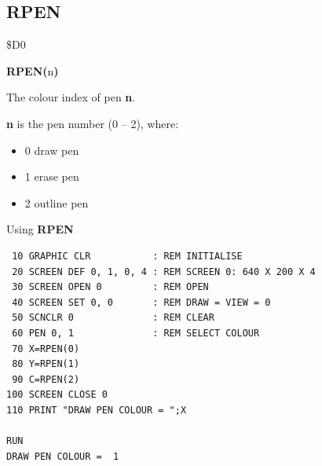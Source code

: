 \subsection{RPEN}
\begin{description}[leftmargin=2cm,style=nextline]
\item [Token:]    \$D0

\item [Format:]   {\bf RPEN(}n{\bf)}

\item [Returns:]  The colour index of pen {\bf n}.

                  {\bf n} is the pen number (0 -- 2), where:

                  \begin{itemize}
                     \item {0} draw pen
                     \item {1} erase pen
                     \item {2} outline pen
                  \end{itemize}

\item [Example:]  Using {\bf RPEN}

\begin{tcolorbox}[colback=black,coltext=white]
\verbatimfont{\codefont}
\begin{verbatim}
 10 GRAPHIC CLR           : REM INITIALISE
 20 SCREEN DEF 0, 1, 0, 4 : REM SCREEN 0: 640 X 200 X 4
 30 SCREEN OPEN 0         : REM OPEN
 40 SCREEN SET 0, 0       : REM DRAW = VIEW = 0
 50 SCNCLR 0              : REM CLEAR
 60 PEN 0, 1              : REM SELECT COLOUR
 70 X=RPEN(0)
 80 Y=RPEN(1)
 90 C=RPEN(2)
100 SCREEN CLOSE 0
110 PRINT "DRAW PEN COLOUR = ";X

RUN
DRAW PEN COLOUR =  1
\end{verbatim}
\end{tcolorbox}
\end{description}


\newpage
